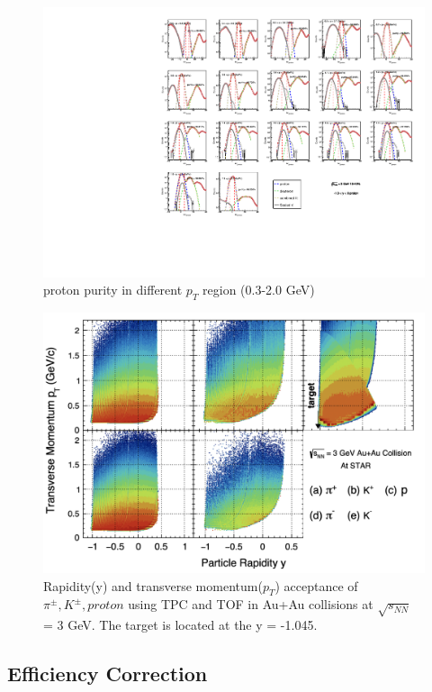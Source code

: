 \begin{figure}
    \centering
    \includegraphics[scale=0.7]{FXT3gev/chapter2/fig/proton_purity.pdf}
    \caption{proton purity in different $p_T$ region (0.3-2.0 GeV)}
    \label{fig:proton_purity}
\end{figure}

\begin{figure}[ht]
\includegraphics [scale=0.4]{chapter2/fig/pikp_acc_3gev.png}
\caption{ Rapidity(y) and transverse momentum($p_{T}$) acceptance of $\pi^{\pm}, K^{\pm}, proton$ using TPC and TOF in Au+Au collisions at $\sqrt{s_{NN}}$ = 3 GeV. The target is located at the y = -1.045. }
\label{fig:pikp_acceptance_fig}
\end{figure}

\clearpage
\newpage

\subsection{Efficiency Correction}

